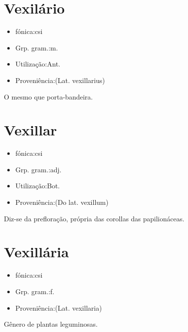 \documentclass{article}
\begin{document}
\section{Vexilário}
\begin{itemize}
\item {fónica:csi}
\end{itemize}
\begin{itemize}
\item {Grp. gram.:m.}
\end{itemize}
\begin{itemize}
\item {Utilização:Ant.}
\end{itemize}
\begin{itemize}
\item {Proveniência:(Lat. \textunderscore vexillarius\textunderscore )}
\end{itemize}
O mesmo que \textunderscore porta-bandeira\textunderscore .
\section{Vexillar}
\begin{itemize}
\item {fónica:csi}
\end{itemize}
\begin{itemize}
\item {Grp. gram.:adj.}
\end{itemize}
\begin{itemize}
\item {Utilização:Bot.}
\end{itemize}
\begin{itemize}
\item {Proveniência:(Do lat. \textunderscore vexillum\textunderscore )}
\end{itemize}
Diz-se da prefloração, própria das corollas das papilionáceas.
\section{Vexillária}
\begin{itemize}
\item {fónica:csi}
\end{itemize}
\begin{itemize}
\item {Grp. gram.:f.}
\end{itemize}
\begin{itemize}
\item {Proveniência:(Lat. \textunderscore vexillaria\textunderscore )}
\end{itemize}
Gênero de plantas leguminosas.
\end{document}
